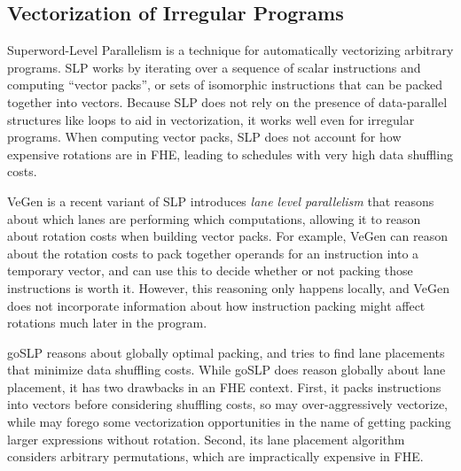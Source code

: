 \subsection{Vectorization of Irregular Programs}
Superword-Level Parallelism \cite{SLP} is a technique for automatically vectorizing arbitrary programs.
SLP works by iterating over a sequence of scalar instructions and computing ``vector packs'', or sets of isomorphic instructions that can be packed together into vectors.
Because SLP does not rely on the presence of data-parallel structures like loops to aid in vectorization, it works well even for irregular programs.
When computing vector packs, SLP does not account for how expensive rotations are in FHE, leading to schedules with very high data shuffling costs. 

VeGen \cite{VeGen} is a recent variant of SLP introduces {\em lane level parallelism} that reasons about which lanes are performing which computations, allowing it to reason about rotation costs when building vector packs.
For example, VeGen can reason about the rotation costs to pack together operands for an instruction into a temporary vector, and can use this to decide whether or not packing those instructions is worth it.
However, this reasoning only happens locally, and VeGen does not incorporate information about how instruction packing might affect rotations much later in the program.

goSLP \cite{goSLP} reasons about globally optimal packing, and tries to find lane placements that minimize data shuffling costs. While goSLP does reason globally about lane placement, it has two drawbacks in an FHE context. First, it packs instructions into vectors before considering shuffling costs, so may over-aggressively vectorize, while \system may forego some vectorization opportunities in the name of getting packing larger expressions without rotation. Second, its lane placement algorithm considers arbitrary permutations, which are impractically expensive in FHE.


